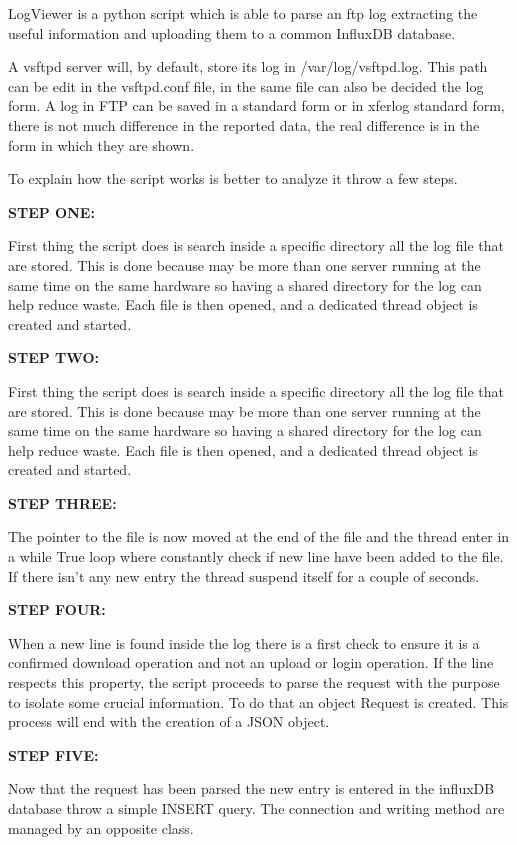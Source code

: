 Log\+Viewer is a python script which is able to parse an ftp log extracting the useful information and uploading them to a common Influx\+DB database.

A vsftpd server will, by default, store its log in /var/log/vsftpd.log. This path can be edit in the vsftpd.\+conf file, in the same file can also be decided the log form. A log in F\+TP can be saved in a standard form or in xferlog standard form, there is not much difference in the reported data, the real difference is in the form in which they are shown.

To explain how the script works is better to analyze it throw a few steps.

{\bfseries{S\+T\+EP O\+NE\+:}}

First thing the script does is search inside a specific directory all the log file that are stored. This is done because may be more than one server running at the same time on the same hardware so having a shared directory for the log can help reduce waste. Each file is then opened, and a dedicated thread object is created and started.

{\bfseries{S\+T\+EP T\+WO\+:}}

First thing the script does is search inside a specific directory all the log file that are stored. This is done because may be more than one server running at the same time on the same hardware so having a shared directory for the log can help reduce waste. Each file is then opened, and a dedicated thread object is created and started.

{\bfseries{S\+T\+EP T\+H\+R\+EE\+:}}

The pointer to the file is now moved at the end of the file and the thread enter in a while True loop where constantly check if new line have been added to the file. If there isn’t any new entry the thread suspend itself for a couple of seconds.

{\bfseries{S\+T\+EP F\+O\+UR\+:}}

When a new line is found inside the log there is a first check to ensure it is a confirmed download operation and not an upload or login operation. If the line respects this property, the script proceeds to parse the request with the purpose to isolate some crucial information. To do that an object Request is created. This process will end with the creation of a J\+S\+ON object.

{\bfseries{S\+T\+EP F\+I\+VE\+:}}

Now that the request has been parsed the new entry is entered in the influx\+DB database throw a simple I\+N\+S\+E\+RT query. The connection and writing method are managed by an opposite class. 